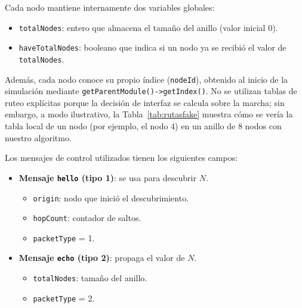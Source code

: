\documentclass[10pt,letterpaper,twocolumn]{article}
\newcommand{\coltablesetup}{%
  \scriptsize
  \setlength{\tabcolsep}{3pt}%
  \renewcommand{\arraystretch}{1.08}%
}
\begin{document}
Cada nodo mantiene internamente dos variables globales:
\begin{itemize}
    \item \texttt{totalNodes}: entero que almacena el tamaño del anillo (valor inicial 0).
    \item \texttt{haveTotalNodes}: booleano que indica si un nodo ya se recibió el valor de \texttt{totalNodes}.
\end{itemize}
Además, cada nodo conoce su propio índice (\texttt{nodeId}), obtenido al inicio de la
simulación mediante \texttt{getParentModule()->getIndex()}. No se utilizan tablas
de ruteo explícitas porque la decisión de interfaz se calcula sobre la marcha;
sin embargo, a modo ilustrativo, la Tabla~\ref{tab:rutasfake} muestra cómo se vería la
tabla local de un nodo (por ejemplo, el nodo 4) en un anillo de 8 nodos con nuestro
algoritmo.

\begin{table}[!ht]
  \centering
  \caption{Ejemplo de tabla de rutas locales en el nodo 4 para un anillo de 8 nodos.}
  \label{tab:rutasfake}
  \coltablesetup
\end{table}

Los mensajes de control utilizados tienen los siguientes campos:

\begin{itemize}
    \item \textbf{Mensaje \texttt{hello} (tipo 1)}: se usa para descubrir \(N\).
        \begin{itemize}
            \item \texttt{origin}: nodo que inició el descubrimiento.
            \item \texttt{hopCount}: contador de saltos.
            \item \texttt{packetType} = 1.
        \end{itemize}
    \item \textbf{Mensaje \texttt{echo} (tipo 2)}: propaga el valor de \(N\).
        \begin{itemize}
            \item \texttt{totalNodes}: tamaño del anillo.
            \item \texttt{packetType} = 2.
        \end{itemize}
\end{itemize}
\end{document}
